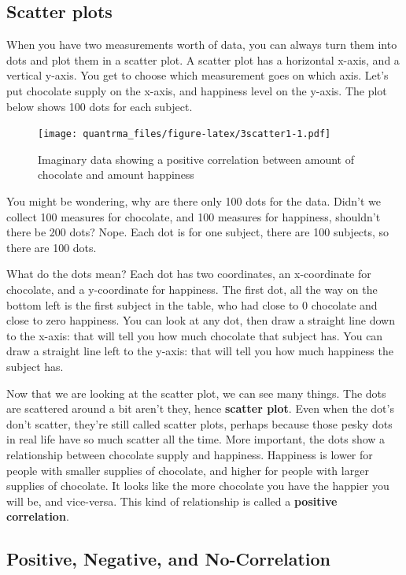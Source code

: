\documentclass[
]{book}
\begin{document}
\hypertarget{scatter-plots}{%
\subsection{Scatter plots}\label{scatter-plots}}

When you have two measurements worth of data, you can always turn them into dots and plot them in a scatter plot. A scatter plot has a horizontal x-axis, and a vertical y-axis. You get to choose which measurement goes on which axis. Let's put chocolate supply on the x-axis, and happiness level on the y-axis. The plot below shows 100 dots for each subject.

\begin{figure}
\centering
\texttt{[image: quantrma\_files/figure-latex/3scatter1-1.pdf]}
\caption{\label{fig:3scatter1}Imaginary data showing a positive correlation between amount of chocolate and amount happiness}
\end{figure}

You might be wondering, why are there only 100 dots for the data. Didn't we collect 100 measures for chocolate, and 100 measures for happiness, shouldn't there be 200 dots? Nope. Each dot is for one subject, there are 100 subjects, so there are 100 dots.

What do the dots mean? Each dot has two coordinates, an x-coordinate for chocolate, and a y-coordinate for happiness. The first dot, all the way on the bottom left is the first subject in the table, who had close to 0 chocolate and close to zero happiness. You can look at any dot, then draw a straight line down to the x-axis: that will tell you how much chocolate that subject has. You can draw a straight line left to the y-axis: that will tell you how much happiness the subject has.

Now that we are looking at the scatter plot, we can see many things. The dots are scattered around a bit aren't they, hence \textbf{scatter plot}. Even when the dot's don't scatter, they're still called scatter plots, perhaps because those pesky dots in real life have so much scatter all the time. More important, the dots show a relationship between chocolate supply and happiness. Happiness is lower for people with smaller supplies of chocolate, and higher for people with larger supplies of chocolate. It looks like the more chocolate you have the happier you will be, and vice-versa. This kind of relationship is called a \textbf{positive correlation}.

\hypertarget{positive-negative-and-no-correlation}{%
\subsection{Positive, Negative, and No-Correlation}\label{positive-negative-and-no-correlation}}
\end{document}
